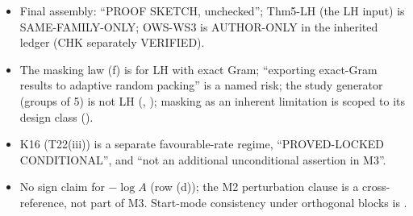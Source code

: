 \begin{notproved}
\begin{itemize}
\item Final assembly: ``PROOF SKETCH, unchecked''; Thm5-LH (the LH input) is SAME-FAMILY-ONLY; OWS-WS3 is AUTHOR-ONLY in the inherited ledger (CHK separately VERIFIED).
\item The masking law (f) is for LH with exact Gram; ``exporting exact-Gram results to adaptive random packing'' is a named risk; the study generator (groups of 5) is not LH (, ); masking as an inherent limitation is scoped to its design class ().
\item K16 (T22(iii)) is a separate favourable-rate regime, ``PROVED-LOCKED CONDITIONAL'', and ``not an additional unconditional assertion in M3''.
\item No sign claim for $-\log A$ (row (d)); the M2 perturbation clause is a cross-reference, not part of M3. Start-mode consistency under orthogonal blocks is .
\end{itemize}
\end{notproved}

